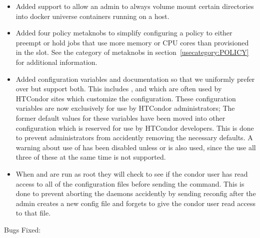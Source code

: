 \begin{itemize}

\item Added support to allow an admin to always volume mount
	certain directories into docker universe containers running
	on a host.

\item Added four policy metaknobs to simplify configuring a policy
	to either preempt or hold jobs that use more memory
	or CPU cores than provisioned in the slot. See the 
	category of metaknobs in section~\ref{usecategory:POLICY} for
	additional information.

\item Added configuration variables and documentation so that we uniformly prefer
     over  but support both. This includes
    ,  and 
    which are often used by HTCondor sites which customize the configuration. These
    configuration variables are now exclusively for use by HTCondor administrators;
    The former default values for these variables have been moved into other configuration
    which is reserved for use by HTCondor developers.  This is done to prevent administrators
    from accidently removing the necessary defaults.
    A warning about use of  has been disabled unless
     or is also used, since
    the use all three of these at the same time is not supported.

\item When  and  are run as root
    they will check to see if the condor user has read access to all of the
    configuration files before sending the command. This is done to prevent aborting the daemons
    accidently by sending reconfig after the admin creates a new config file and
    forgets to give the condor user read access to that file.

\end{itemize}

\noindent Bugs Fixed:

